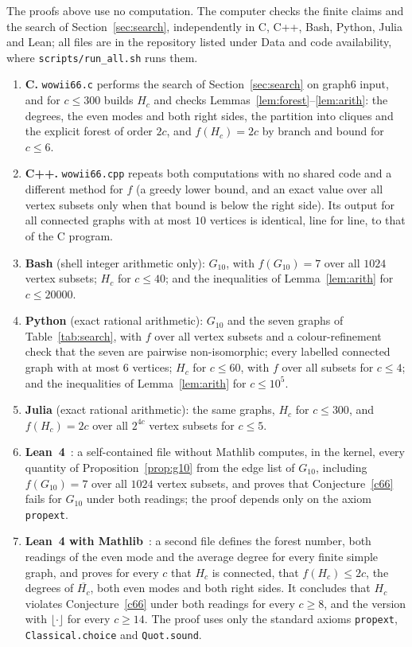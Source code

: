 \documentclass[11pt]{amsart}
\theoremstyle{definition}
\theoremstyle{remark}
\numberwithin{equation}{section}
\begin{document}
The proofs above use no computation. The computer checks the finite claims and the search of Section~\ref{sec:search}, independently in C, C++, Bash, Python, Julia and Lean; all files are in the repository listed under Data and code availability, where \texttt{scripts/run\_all.sh} runs them.
\begin{enumerate}
\item \textbf{C.} \texttt{wowii66.c} performs the search of Section~\ref{sec:search} on graph6 input, and for $c\le300$ builds $H_c$ and checks Lemmas~\ref{lem:forest}--\ref{lem:arith}: the degrees, the even modes and both right sides, the partition into cliques and the explicit forest of order $2c$, and $f(H_c)=2c$ by branch and bound for $c\le6$.
\item \textbf{C++.} \texttt{wowii66.cpp} repeats both computations with no shared code and a different method for $f$ (a greedy lower bound, and an exact value over all vertex subsets only when that bound is below the right side). Its output for all connected graphs with at most $10$ vertices is identical, line for line, to that of the C program.
\item \textbf{Bash} (shell integer arithmetic only): $G_{10}$, with $f(G_{10})=7$ over all $1024$ vertex subsets; $H_c$ for $c\le40$; and the inequalities of Lemma~\ref{lem:arith} for $c\le20000$.
\item \textbf{Python} (exact rational arithmetic): $G_{10}$ and the seven graphs of Table~\ref{tab:search}, with $f$ over all vertex subsets and a colour-refinement check that the seven are pairwise non-isomorphic; every labelled connected graph with at most $6$ vertices; $H_c$ for $c\le60$, with $f$ over all subsets for $c\le4$; and the inequalities of Lemma~\ref{lem:arith} for $c\le10^5$.
\item \textbf{Julia} (exact rational arithmetic): the same graphs, $H_c$ for $c\le300$, and $f(H_c)=2c$ over all $2^{4c}$ vertex subsets for $c\le5$.
\item \textbf{Lean~4}~\cite{MouraUllrich2021}: a self-contained file without Mathlib computes, in the kernel, every quantity of Proposition~\ref{prop:g10} from the edge list of $G_{10}$, including $f(G_{10})=7$ over all $1024$ vertex subsets, and proves that Conjecture~\ref{c66} fails for $G_{10}$ under both readings; the proof depends only on the axiom \texttt{propext}.
\item \textbf{Lean~4 with Mathlib}~\cite{Mathlib2020}: a second file defines the forest number, both readings of the even mode and the average degree for every finite simple graph, and proves for every $c$ that $H_c$ is connected, that $f(H_c)\le2c$, the degrees of $\overline{H_c}$, both even modes and both right sides. It concludes that $H_c$ violates Conjecture~\ref{c66} under both readings for every $c\ge8$, and the version with $\lfloor\cdot\rfloor$ for every $c\ge14$. The proof uses only the standard axioms \texttt{propext}, \texttt{Classical.choice} and \texttt{Quot.sound}.
\end{enumerate}
\end{document}
